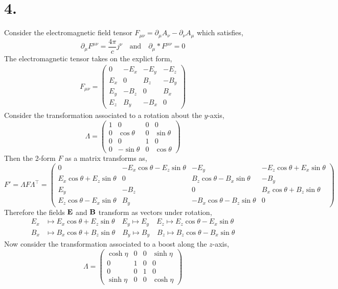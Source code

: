 \documentclass[12pt]{article}
\begin{document}
\section*{4.}

Consider the electromagnetic field tensor $F_{\mu \nu} = \partial_\mu A_\nu - \partial_\nu A_\mu$ which satisfies,
\[ \partial_\mu F^{\mu \nu} = \frac{4 \pi}{c} j^\nu \quad \text{and} \quad \partial_{\mu} * F^{\mu \nu} = 0 \]
The electromagnetic tensor takes on the explict form,
\begin{align*}
F_{\mu \nu} =
\begin{pmatrix}
0 & - E_x & - E_y & - E_z
\\
E_x & 0 & B_z & - B_y
\\
E_y & - B_z & 0 & B_x
\\
E_z & B_y & - B_x & 0
\end{pmatrix}
\end{align*}
Consider the transformation associated to a rotation about the $y$-axis,
\[ \Lambda = 
\begin{pmatrix}
1 & 0 & 0 & 0
\\
0 & \cos{\theta} &  0 & \sin{\theta}
\\
0 & 0 & 1 & 0 
\\
0 & - \sin{\theta} & 0 & \cos{\theta}
\end{pmatrix} \]
Then the 2-form $F$ as a matrix transforms as,
\[ F' = \Lambda F \Lambda^\top = 
\begin{pmatrix}
0 & - E_x \cos{\theta} - E_z \sin{\theta} & - E_y & - E_z \cos{\theta} + E_x \sin{\theta}
\\
E_x \cos{\theta} + E_z \sin{\theta} & 0 & B_z \cos{\theta} - B_x \sin{\theta} & - B_y
\\
E_y  & - B_z & 0 & B_x \cos{\theta} + B_z \sin{\theta}
\\
E_z \cos{\theta} - E_x \sin{\theta} & B_y  & - B_x \cos{\theta} - B_z \sin{\theta} & 0
\end{pmatrix} \]
Therefore the fields $\bf{E}$ and $\bf{B}$ transform as vectors under rotation,
\begin{align*}
E_x & \mapsto E_x \cos{\theta} + E_z \sin{\theta} \quad E_y \mapsto E_y \quad E_z \mapsto E_z \cos{\theta} - E_x \sin{\theta}
\\
B_x & \mapsto B_x \cos{\theta} + B_z \sin{\theta} \quad B_y \mapsto B_y \quad B_z \mapsto B_z \cos{\theta} - B_x \sin{\theta}
\end{align*}
Now consider the transformation associated to a boost along the $z$-axis,
\[ \Lambda = 
\begin{pmatrix}
\cosh{\eta} & 0 & 0 & \sinh{\eta}
\\
0 & 1 &  0 & 0
\\
0 & 0 & 1 & 0 
\\
\sinh{\eta} & 0 & 0 & \cosh{\eta}
\end{pmatrix} \]
\end{document}
